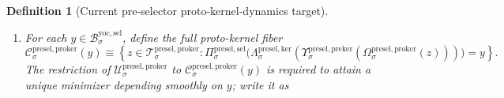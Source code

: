\documentclass[11pt]{article}
\newcommand{\YoctoSelectorBody}[1]{\mathcal B_{#1}^{\mathrm{yoc,sel}}}
\newcommand{\YoctoSelectorShell}[1]{\mathcal Z_{#1}^{\mathrm{yoc,sel}}}
\newcommand{\PreSectionSelectorBody}[1]{\mathcal B_{#1}^{\mathrm{presel,sel}}}
\newcommand{\PreSectionSelectorProj}[1]{\Pi_{#1}^{\mathrm{presel,sel}}}
\newcommand{\PreSectionSelectorFiber}[2]{\mathcal G_{#1}^{\mathrm{presel,sel}}(#2)}
\newcommand{\KernelBody}[1]{\mathcal K_{#1}^{\mathrm{presel,ker}}}
\newcommand{\KernelProj}[1]{\Lambda_{#1}^{\mathrm{presel,ker}}}
\newcommand{\KernelComposedFiber}[2]{\mathcal M_{#1}^{\mathrm{presel,ker}}(#2)}
\newcommand{\PreKernelBody}[1]{\mathcal P_{#1}^{\mathrm{presel,preker}}}
\newcommand{\PreKernelProj}[1]{\Upsilon_{#1}^{\mathrm{presel,preker}}}
\newcommand{\PreKernelFullFiber}[2]{\mathcal W_{#1}^{\mathrm{presel,preker}}(#2)}
\newcommand{\ProtoKernelBody}[1]{\mathcal T_{#1}^{\mathrm{presel,proker}}}
\newcommand{\ProtoKernelProj}[1]{\Omega_{#1}^{\mathrm{presel,proker}}}
\newcommand{\ProtoKernelFunctional}[1]{\mathscr U_{#1}^{\mathrm{presel,proker}}}
\newcommand{\ProtoKernelFullFiber}[2]{\mathcal C_{#1}^{\mathrm{presel,proker}}(#2)}
\newcommand{\InducedSelectorFunctional}[1]{\widetilde{\mathscr Q}_{#1}^{\mathrm{presel,sel}}}
\newcommand{\InducedSelectorShell}[1]{\widetilde{\mathcal Z}_{#1}^{\mathrm{presel,sel}}}
\newcommand{\InducedKernelFunctional}[1]{\widetilde{\mathscr R}_{#1}^{\mathrm{presel,ker}}}
\newcommand{\InducedKernelComposedMin}[1]{\widetilde{\mathfrak m}_{#1}^{\mathrm{presel,ker}}}
\newcommand{\InducedKernelShell}[1]{\widetilde{\mathcal Y}_{#1}^{\mathrm{presel,ker}}}
\newcommand{\InducedPreKernelFunctional}[1]{\widetilde{\mathscr S}_{#1}^{\mathrm{presel,preker}}}
\newcommand{\InducedPreKernelShell}[1]{\widetilde{\mathcal O}_{#1}^{\mathrm{presel,preker}}}
\newtheorem{definition}{Definition}
\begin{document}
\begin{definition}[Current pre-selector proto-kernel-dynamics target]
\begin{enumerate}
\[    \right\}
    \]
    is required to attain a unique minimizer depending smoothly on \(y\); write it as
    \[
    \InducedKernelComposedMin{\sigma}:\YoctoSelectorBody{\sigma}\to\KernelBody{\sigma}.
    \]
    Define the induced exact selector shell
    \[
    \InducedSelectorShell{\sigma}
    \equiv
    \left\{
    u\in\PreSectionSelectorBody{\sigma}:
    \PreSectionSelectorProj{\sigma}(u)\in\YoctoSelectorShell{\sigma},
    \;
    \InducedSelectorFunctional{\sigma}(u)
    =
    \min_{v\in\PreSectionSelectorFiber{\sigma}{\PreSectionSelectorProj{\sigma}(u)}}
    \InducedSelectorFunctional{\sigma}(v)
    \right\},
    \]
    the induced exact kernel shell
    \[
    \InducedKernelShell{\sigma}
    \equiv
    \left\{
    w\in\KernelBody{\sigma}:
    \PreSectionSelectorProj{\sigma}\bigl(\KernelProj{\sigma}(w)\bigr)\in\YoctoSelectorShell{\sigma},
    \;
    \InducedKernelFunctional{\sigma}(w)
    =
    \min_{q\in\KernelComposedFiber{\sigma}{\PreSectionSelectorProj{\sigma}(\KernelProj{\sigma}(w))}}
    \InducedKernelFunctional{\sigma}(q)
    \right\},
    \]
    and the induced exact pre-kernel shell
    \[
    \InducedPreKernelShell{\sigma}
    \equiv
    \left\{
    q\in\PreKernelBody{\sigma}:
    \PreSectionSelectorProj{\sigma}\bigl(\KernelProj{\sigma}(\PreKernelProj{\sigma}(q))\bigr)\in\YoctoSelectorShell{\sigma},
    \;
    \InducedPreKernelFunctional{\sigma}(q)
    =
    \min_{p\in\PreKernelFullFiber{\sigma}{\PreSectionSelectorProj{\sigma}(\KernelProj{\sigma}(\PreKernelProj{\sigma}(q)))}} \InducedPreKernelFunctional{\sigma}(p)
    \right\}.
    \]
    The shells \(\InducedKernelShell{\sigma}\) and \(\InducedPreKernelShell{\sigma}\) are required to be closed embedded submanifolds, and
    \[
    \KernelProj{\sigma}\big|_{\InducedKernelShell{\sigma}}
    :
    \InducedKernelShell{\sigma}\xrightarrow{\cong}\InducedSelectorShell{\sigma},
    \qquad
    \PreKernelProj{\sigma}\big|_{\InducedPreKernelShell{\sigma}}
    :
    \InducedPreKernelShell{\sigma}\xrightarrow{\cong}\InducedKernelShell{\sigma}
    \]
    are required to be diffeomorphisms.
    \item For each \(y\in\YoctoSelectorBody{\sigma}\), define the full proto-kernel fiber
    \[
    \ProtoKernelFullFiber{\sigma}{y}
    \equiv
    \left\{
    z\in\ProtoKernelBody{\sigma}:
    \PreSectionSelectorProj{\sigma}\bigl(\KernelProj{\sigma}(\PreKernelProj{\sigma}(\ProtoKernelProj{\sigma}(z)))\bigr)=y
    \right\}.
    \]
    The restriction of \(\ProtoKernelFunctional{\sigma}\) to \(\ProtoKernelFullFiber{\sigma}{y}\) is required to attain a unique minimizer depending smoothly on \(y\); write it as

\end{enumerate}
\end{definition}
\end{document}
